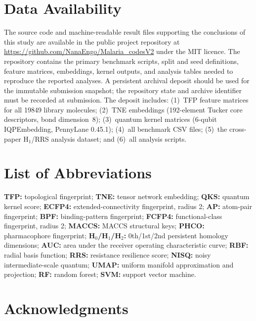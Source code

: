 \documentclass[11pt,a4paper]{article}
\begin{document}

\section*{Data Availability}

The source code and machine-readable result files supporting the conclusions of this study are available in the public project repository at \url{https://github.com/NanaEngo/Malaria_codesV2} under the MIT licence. The repository contains the primary benchmark scripts, split and seed definitions, feature matrices, embeddings, kernel outputs, and analysis tables needed to reproduce the reported analyses. A persistent archival deposit should be used for the immutable submission snapshot; the repository state and archive identifier must be recorded at submission. The deposit includes: (1)~TFP feature matrices for all \num{19849} library molecules; (2)~TNE embeddings (\num{192}-element Tucker core descriptors, bond dimension~8); (3)~quantum kernel matrices (6-qubit IQPEmbedding, PennyLane 0.45.1); (4)~all benchmark CSV files; (5)~the cross-paper H$_1$/RRS analysis dataset; and (6)~all analysis scripts.

\section*{List of Abbreviations}

\textbf{TFP:} topological fingerprint; \textbf{TNE:} tensor network embedding; \textbf{QKS:} quantum kernel score; \textbf{ECFP4:} extended-connectivity fingerprint, radius 2; \textbf{AP:} atom-pair fingerprint; \textbf{BPF:} binding-pattern fingerprint; \textbf{FCFP4:} functional-class fingerprint, radius 2; \textbf{MACCS:} MACCS structural keys; \textbf{PHCO:} pharmacophore fingerprint; \textbf{H$_0$/H$_1$/H$_2$:} 0th/1st/2nd persistent homology dimensions; \textbf{AUC:} area under the receiver operating characteristic curve; \textbf{RBF:} radial basis function; \textbf{RRS:} resistance resilience score; \textbf{NISQ:} noisy intermediate-scale quantum; \textbf{UMAP:} uniform manifold approximation and projection; \textbf{RF:} random forest; \textbf{SVM:} support vector machine.

\section*{Acknowledgments}
\end{document}
